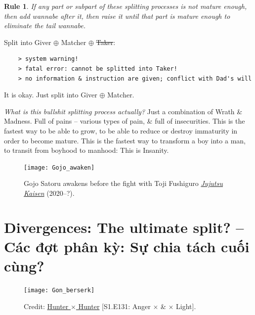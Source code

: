 \documentclass[12pt,twoside]{book}
\newtheorem{Rule}{Rule}
\begin{document}
\begin{Rule}
	If any part or subpart of these splitting processes is not mature enough, then add {\it wannabe} after it, then raise it until that part is mature enough to eliminate the tail {\it wannabe}.
\end{Rule}
Split into Giver $\oplus$ Matcher $\oplus$ \st{Taker}:
\begin{verbatim}
	> system warning!
	> fatal error: cannot be splitted into Taker!
	> no information & instruction are given; conflict with Dad's will
\end{verbatim}
It is okay. Just split into Giver $\oplus$ Matcher.

{\it What is this bullshit splitting process actually?} Just a combination of {\sf Wrath} \& {\sf Madness}. Full of pains -- various types of pain, \& full of insecurities. This is the fastest way to be able to grow, to be able to reduce or destroy immaturity in order to become mature. This is the fastest way to transform a boy into a man, to transit from boyhood to manhood: This is {\sc Insanity}.

\begin{figure}[H]
	\centering
	\texttt{[image: Gojo\_awaken]}
	\caption{{\sf Gojo Satoru} awakens before the fight with {\sf Toji Fushiguro} \href{https://www.imdb.com/title/tt12343534/}{\it Jujutsu Kaisen} (2020--?).}
\end{figure}

\section{Divergences: The ultimate split? -- Các đợt phân kỳ: Sự chia tách cuối cùng?}
\begin{flushright}
	\musEighth[\href{https://www.youtube.com/watch?v=_4m02-f9aQs}{Hyori Ittai Lamento for Piano} | Hunter $\times$ Hunter]\musEighth
\end{flushright}

\begin{figure}[H]
	\centering
	\texttt{[image: Gon\_berserk]}
	\caption{Credit: \href{https://www.imdb.com/title/tt3748420/}{Hunter $\times$ Hunter} [S1.E131: Anger $\times$ \& $\times$ Light].}
\end{figure}
\end{document}
